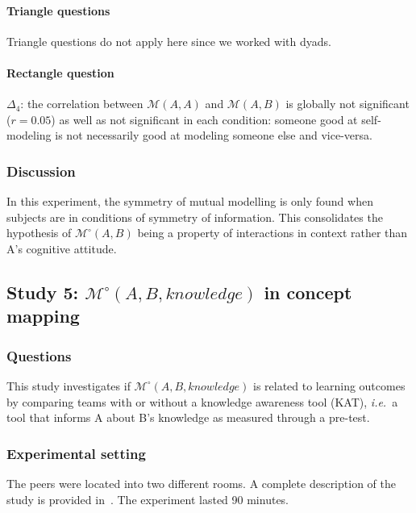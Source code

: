 \documentclass[twocolumn]{article}
\newcommand{\ie}{{\textit{i.e.\ }}}
\newcommand{\gmodel}[2]{{$\mathcal{M}(#1, #2)$}}
\newcommand{\Model}[3]{{$\mathcal{M}^{\circ}(#1, #2, #3)$}}
\newcommand{\gModel}[2]{{$\mathcal{M}^{\circ}(#1, #2)$}}
\begin{document}
\paragraph{Triangle questions} Triangle questions do not apply here since we
worked with dyads.

\paragraph{Rectangle question}$\Delta_4$: the correlation between \gmodel{A}{A}
and \gmodel{A}{B} is globally not significant ($r=0.05$) as well as not
significant in each condition: someone good at self-modeling is not necessarily
good at modeling someone else and vice-versa.

\subsubsection*{Discussion}

In this experiment, the symmetry of mutual modelling is only found when subjects
are in conditions of symmetry of information. This consolidates the hypothesis
of \gModel{A}{B} being a property of interactions in context rather than A's
cognitive attitude.



\subsection{Study 5: \Model{A}{B}{knowledge} in concept mapping}

\subsubsection*{Questions}

This study investigates if \Model{A}{B}{knowledge} is related to learning
outcomes by comparing teams with or without a knowledge awareness tool (KAT),
\ie a tool that informs A about B's knowledge as measured through a pre-test.

\subsubsection*{Experimental setting}

The peers were located into two different rooms. A complete description of the
study is provided in~\citep{sangin2008learners}. The experiment lasted 90 minutes.
\end{document}
